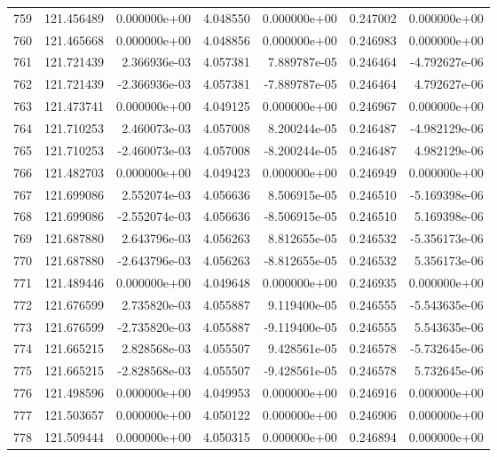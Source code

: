 \begin{tabular}{rrrrrrr}
 759 & 121.456489 &  0.000000e+00 &  4.048550 &  0.000000e+00 &   0.247002 &  0.000000e+00 \\
 760 & 121.465668 &  0.000000e+00 &  4.048856 &  0.000000e+00 &   0.246983 &  0.000000e+00 \\
 761 & 121.721439 &  2.366936e-03 &  4.057381 &  7.889787e-05 &   0.246464 & -4.792627e-06 \\
 762 & 121.721439 & -2.366936e-03 &  4.057381 & -7.889787e-05 &   0.246464 &  4.792627e-06 \\
 763 & 121.473741 &  0.000000e+00 &  4.049125 &  0.000000e+00 &   0.246967 &  0.000000e+00 \\
 764 & 121.710253 &  2.460073e-03 &  4.057008 &  8.200244e-05 &   0.246487 & -4.982129e-06 \\
 765 & 121.710253 & -2.460073e-03 &  4.057008 & -8.200244e-05 &   0.246487 &  4.982129e-06 \\
 766 & 121.482703 &  0.000000e+00 &  4.049423 &  0.000000e+00 &   0.246949 &  0.000000e+00 \\
 767 & 121.699086 &  2.552074e-03 &  4.056636 &  8.506915e-05 &   0.246510 & -5.169398e-06 \\
 768 & 121.699086 & -2.552074e-03 &  4.056636 & -8.506915e-05 &   0.246510 &  5.169398e-06 \\
 769 & 121.687880 &  2.643796e-03 &  4.056263 &  8.812655e-05 &   0.246532 & -5.356173e-06 \\
 770 & 121.687880 & -2.643796e-03 &  4.056263 & -8.812655e-05 &   0.246532 &  5.356173e-06 \\
 771 & 121.489446 &  0.000000e+00 &  4.049648 &  0.000000e+00 &   0.246935 &  0.000000e+00 \\
 772 & 121.676599 &  2.735820e-03 &  4.055887 &  9.119400e-05 &   0.246555 & -5.543635e-06 \\
 773 & 121.676599 & -2.735820e-03 &  4.055887 & -9.119400e-05 &   0.246555 &  5.543635e-06 \\
 774 & 121.665215 &  2.828568e-03 &  4.055507 &  9.428561e-05 &   0.246578 & -5.732645e-06 \\
 775 & 121.665215 & -2.828568e-03 &  4.055507 & -9.428561e-05 &   0.246578 &  5.732645e-06 \\
 776 & 121.498596 &  0.000000e+00 &  4.049953 &  0.000000e+00 &   0.246916 &  0.000000e+00 \\
 777 & 121.503657 &  0.000000e+00 &  4.050122 &  0.000000e+00 &   0.246906 &  0.000000e+00 \\
 778 & 121.509444 &  0.000000e+00 &  4.050315 &  0.000000e+00 &   0.246894 &  0.000000e+00 \\

\end{tabular}
